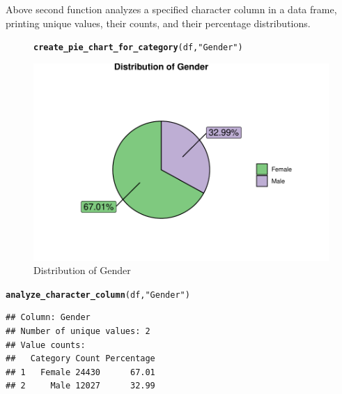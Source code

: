 \documentclass{article}\usepackage[]{graphicx}\usepackage[]{xcolor}
\makeatletter
\def\maxwidth{ %
  \ifdim\Gin@nat@width>\linewidth
    \linewidth
  \else
    \Gin@nat@width
  \fi
}
\newcommand{\hlsng}[1]{\textcolor[rgb]{0.192,0.494,0.8}{#1}}%
\newcommand{\hldef}[1]{\textcolor[rgb]{0.345,0.345,0.345}{#1}}%
\newcommand{\hlkwd}[1]{\textcolor[rgb]{0.737,0.353,0.396}{\textbf{#1}}}%
\newenvironment{kframe}{%
 \def\at@end@of@kframe{}%
 \ifinner\ifhmode%
  \def\at@end@of@kframe{\end{minipage}}%
  \begin{minipage}{\columnwidth}%
 \fi\fi%
 \def\FrameCommand##1{\hskip\@totalleftmargin \hskip-\fboxsep
 \colorbox{shadecolor}{##1}\hskip-\fboxsep
     \hskip-\linewidth \hskip-\@totalleftmargin \hskip\columnwidth}%
 \MakeFramed {\advance\hsize-\width
   \@totalleftmargin\z@ \linewidth\hsize
   \@setminipage}}%
 {\par\unskip\endMakeFramed%
 \at@end@of@kframe}
\newenvironment{knitrout}{}{} %
\makeatother
\begin{document}
Above second function analyzes a specified character column in a data frame, printing unique values, their counts, and their percentage distributions.

\begin{figure}[H] %
\centering
\begin{knitrout}
\color{fgcolor}\begin{kframe}
\begin{alltt}
\hlkwd{create_pie_chart_for_category}\hldef{(df,} \hlsng{"Gender"}\hldef{)}
\end{alltt}
\end{kframe}
\includegraphics[width=\maxwidth]{figure/unnamed-chunk-15-1} 
\end{knitrout}
\vspace{-40pt} %
\caption{Distribution of Gender}
\end{figure}

\begin{knitrout}
\color{fgcolor}\begin{kframe}
\begin{alltt}
\hlkwd{analyze_character_column}\hldef{(df,} \hlsng{"Gender"}\hldef{)}
\end{alltt}
\begin{verbatim}
## Column: Gender 
## Number of unique values: 2 
## Value counts:
##   Category Count Percentage
## 1   Female 24430      67.01
## 2     Male 12027      32.99
\end{verbatim}
\end{kframe}
\end{knitrout}
\end{document}
